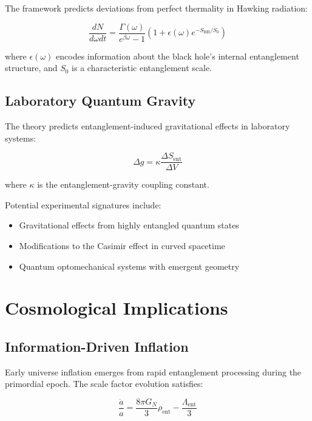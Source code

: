 \documentclass[twocolumn,showpacs,preprintnumbers,amsmath,amssymb,aps]{revtex4-1}
\begin{document}
The framework predicts deviations from perfect thermality in Hawking radiation:

\begin{equation}
\frac{dN}{d\omega dt} = \frac{\Gamma(\omega)}{e^{\beta\omega} - 1} \left(1 + \epsilon(\omega) e^{-S_{\text{BH}}/S_0}\right)
\label{eq:hawking_deviations}
\end{equation}

where $\epsilon(\omega)$ encodes information about the black hole's internal entanglement structure, and $S_0$ is a characteristic entanglement scale.

\subsection{Laboratory Quantum Gravity}

The theory predicts entanglement-induced gravitational effects in laboratory systems:

\begin{equation}
\Delta g = \kappa \frac{\Delta S_{\text{ent}}}{\Delta V}
\label{eq:lab_gravity}
\end{equation}

where $\kappa$ is the entanglement-gravity coupling constant.

Potential experimental signatures include:
\begin{itemize}
\item Gravitational effects from highly entangled quantum states
\item Modifications to the Casimir effect in curved spacetime
\item Quantum optomechanical systems with emergent geometry
\end{itemize}

\section{Cosmological Implications}

\subsection{Information-Driven Inflation}

Early universe inflation emerges from rapid entanglement processing during the primordial epoch. The scale factor evolution satisfies:

\begin{equation}
\frac{\ddot{a}}{a} = \frac{8\pi G_N}{3} \rho_{\text{ent}} - \frac{\Lambda_{\text{ent}}}{3}
\label{eq:inflation_equation}
\end{equation}
\end{document}
